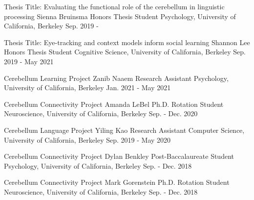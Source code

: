 

\begin{cventries}

  \cventry
    {Thesis Title: Evaluating the functional role of the cerebellum in linguistic processing}
    {Sienna Bruinsma} %
    {Honors Thesis Student} %
    {Psychology, University of California, Berkeley}
    {Sep. 2019 - } %
    
  \cventry
    {Thesis Title: Eye-tracking and context models inform social learning} %
    {Shannon Lee} %
    {Honors Thesis Student} %
    {Cognitive Science, University of California, Berkeley}
    {Sep. 2019 - May 2021} %
    
  \cventry
    {Cerebellum Learning Project}
    {Zanib Naaem} %
    {Research Assistant} %
    {Psychology, University of California, Berkeley}
    {Jan. 2021 - May 2021} %
    
  \cventry
    {Cerebellum Connectivity Project}
    {Amanda LeBel} %
    {Ph.D. Rotation Student} %
    {Neuroscience, University of California, Berkeley}
    {Sep. - Dec. 2020} %

  \cventry
    {Cerebellum Language Project}
    {Yiling Kao} %
    {Research Assistant} %
    {Computer Science, University of California, Berkeley}
    {Sep. 2019 - May 2020} %
    
  \cventry
    {Cerebellum Connectivity Project}
    {Dylan Benkley} %
    {Post-Baccalaureate Student} %
    {Psychology, University of California, Berkeley}
    {Sep. - Dec. 2018} %
    
  \cventry
    {Cerebellum Connectivity Project}
    {Mark Gorenstein} %
    {Ph.D. Rotation Student} %
    {Neuroscience, University of California, Berkeley}
    {Sep. - Dec. 2018} %

\end{cventries}
